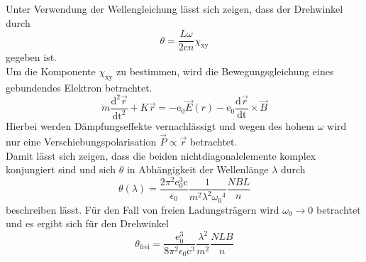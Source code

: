   Unter Verwendung der Wellengleichung lässt sich zeigen, dass der Drehwinkel durch
  \begin{equation}
    \theta=\frac{L\omega}{2\text{c}n}\chi_{\text{xy}}
  \end{equation}
  gegeben ist.\\
  Um die Komponente $\chi_{\text{xy}}$ zu bestimmen, wird die Bewegungsgleichung
  eines gebundendes Elektron betrachtet.
  \begin{equation}
    m\frac{\text{d}^2 \vec{r}}{\text{dt}^2}+K\vec{r}= -\text{e}_0
    \vec{E}(r)-\text{e}_0\frac{\text{d}\vec{r}}{\text{dt}}\times \vec{B}
    \end{equation}
  Hierbei werden Dämpfungseffekte vernachlässigt und wegen des hohem $\omega$ wird nur eine
  Verschiebungspolarisation $\vec{P} \propto \vec{r}$ betrachtet.\\
  Damit lässt sich zeigen, dass
  die beiden nichtdiagonalelemente komplex konjungiert sind und sich $\theta$ in Abhängigkeit der
  Wellenlänge $\lambda$ durch
  \begin{equation}
    \theta(\lambda)=\frac{2\pi^2 \text{e}_0^3 \text{c}}{\epsilon_0}\frac{1}{m^2 \lambda^2 \omega{_0}^4}\frac{N B L}{n}
    \label{eq:WinkelLambda}
  \end{equation}
      beschreiben lässt.
  Für den Fall von freien Ladungsträgern wird $\omega_0 \rightarrow 0$ betrachtet und es ergibt sich für den Drehwinkel
\begin{equation}
  \theta_{\text{frei}}=\frac{\text{e}_0^3}{8 \pi^2 \epsilon_0 \text{c}^3}\frac{\lambda^2}{m^2}\frac{N L B}{n}
  \label{eq:Winkelfrei}
\end{equation}
